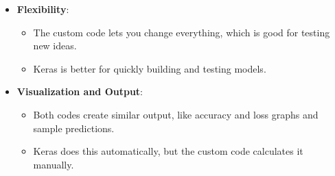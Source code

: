 \documentclass[lettersize,journal]{IEEEtran}
\begin{document}
\begin{itemize}
    \item \textbf{Flexibility}:
    \begin{itemize}
        \item The custom code lets you change everything, which is good for testing new ideas.
        \item Keras is better for quickly building and testing models.
    \end{itemize}
    
    \item \textbf{Visualization and Output}:
    \begin{itemize}
        \item Both codes create similar output, like accuracy and loss graphs and sample predictions.
        \item Keras does this automatically, but the custom code calculates it manually.
    \end{itemize}
\end{itemize}
\end{document}
